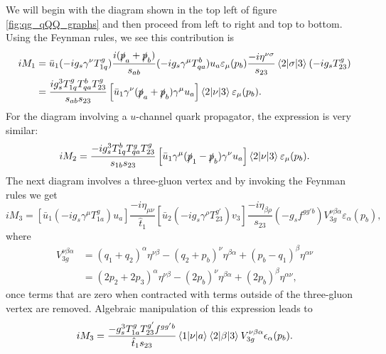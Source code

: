 We will begin with the diagram shown in the top left of figure  \ref{fig:qg_qQQ_graphs} and then proceed from left to right and top to bottom. Using the Feynman rules, we see this contribution is
\begin{equation}
\begin{split}
iM_1 &= \bar{u}_1(-ig_s\gamma^\nu T^g_{1q})\frac{i(\slashed{p}_a+\slashed{p}_b)}{s_{ab}}(-ig_s \gamma^\mu T_{qa}^b)u_a \varepsilon_\mu(p_b) \frac{-i \eta^{\nu \sigma}}{s_{23}} \mathinner{\langle2\vert\sigma\vert3\rangle}_{} (- i g_s T^g_{23}) \\
&= \frac{i g_s^3 T^g_{1q}T^b_{qa}T^g_{23}}{s_{ab}s_{23}} \left[ \bar{u}_1 \gamma^\nu (\slashed{p}_a + \slashed{p}_b) \gamma^\mu u_a \right] \mathinner{\langle2\vert\nu\vert3\rangle}_{} \varepsilon_\mu (p_b).
\end{split}
\end{equation}
For the diagram involving a $u$-channel quark propagator, the expression is very similar:
\begin{equation}
iM_2 = \frac{-i g_s^3 T^b_{1q}T^g_{qa}T^g_{23}}{s_{1b}s_{23}} \left[ \bar{u}_1 \gamma^\mu (\slashed{p}_1 - \slashed{p}_b) \gamma^\nu u_a \right] \mathinner{\langle2\vert\nu\vert3\rangle}_{} \varepsilon_\mu (p_b).
\end{equation}
The next diagram involves a three-gluon vertex and by invoking the Feynman rules we get
\begin{equation}
iM_3 = \left[\bar{u}_1(-i g_s \gamma^\mu T^g_{1a}) u_a \right] \frac{-i \eta_{\mu \nu}}{\hat{t}_1} \left[\bar{u}_2 (-i g_s \gamma^\rho T^{g'}_{23}) v_3 \right] \frac{- i \eta_{\beta \rho}}{s_{23}} (-g_s f^{g g' b})V_{3g}^{\nu  \beta \alpha} \varepsilon_\alpha(p_b),
\end{equation}
where
\begin{equation}
\begin{split}
V_{3g}^{\nu \beta \alpha} &= (q_1+q_2)^\alpha \eta^{\nu \beta} - (q_2+p_b)^\nu \eta^{\beta \alpha} + (p_b-q_1)^\beta \eta^{ \alpha \nu} \\
&= (2p_2 + 2p_3)^\alpha \eta^{\nu \beta} - (2p_b)^\nu \eta^{\beta \alpha} + (2p_b)^\beta \eta^{ \alpha \nu},
\end{split}
\end{equation}
once terms that are zero when contracted with terms outside of the three-gluon vertex are removed. Algebraic manipulation of this expression leads to
\begin{equation}
iM_3 = \frac{-g_s^3 T^g_{1a} T^{g'}_{23} f^{g g' b}}{\hat{t}_1 s_{23}}  \mathinner{\langle1\vert\nu\vert a\rangle}_{} \mathinner{\langle2\vert\beta\vert3\rangle}_{} V_{3g}^{\nu \beta \alpha}\epsilon_\alpha(p_b).
\end{equation}
